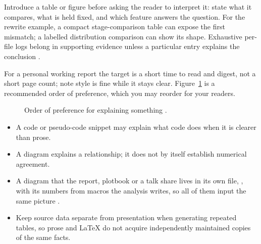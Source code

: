 Introduce a table or figure before asking the reader to interpret it: state what it
compares, what is held fixed, and which feature answers the question. For the rewrite
example, a compact stage-comparison table can expose the first mismatch; a labelled
distribution comparison can show its shape. Exhaustive per-file logs belong in supporting
evidence unless a particular entry explains the conclusion \cite[Design the argument;
  Choose form by information structure]{skill:report-production}.

For a personal working report the target is a short time to read and digest, not a short
page count; note style is fine while it stays clear. Figure~\ref{fig:reports-forms} is a
recommended order of preference, which you may reorder for your readers.

\begin{figure}[H]
  \centering
  \caption{Order of preference for explaining something \cite[Choose form by information
      structure]{skill:report-production}.}
  \label{fig:reports-forms}
\end{figure}

\begin{itemize}
  \item A code or pseudo-code snippet may explain what code does when it is clearer than prose.
  \item A diagram explains a relationship; it does not by itself establish numerical agreement.
  \item A diagram that the report, plotbook or a talk share lives in its own file,
        , with its numbers from macros the analysis writes, so all of
        them input the same picture \cite[Diagrams as asset files]{skill:report-production}.
  \item Keep source data separate from presentation when generating repeated tables, so prose and
        LaTeX do not acquire independently maintained copies of the same facts.
\end{itemize}

